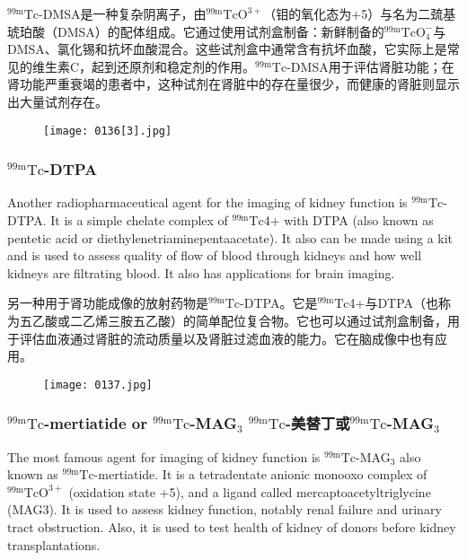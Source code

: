 \documentclass[dvipsnames, svgnames,a4paper,11pt]{article}
\begin{document}
${}^\mathrm{99m}\mathrm{Tc}$-DMSA是一种复杂阴离子，由${}^\mathrm{99m}\mathrm{TcO^{3+}}$（钼的氧化态为+5）与名为二巯基琥珀酸（DMSA）的配体组成。它通过使用试剂盒制备：新鲜制备的${}^\mathrm{99m}\mathrm{TcO_4^-}$与DMSA、氯化锡和抗坏血酸混合。这些试剂盒中通常含有抗坏血酸，它实际上是常见的维生素C，起到还原剂和稳定剂的作用。${}^\mathrm{99m}\mathrm{Tc}$-DMSA用于评估肾脏功能；在肾功能严重衰竭的患者中，这种试剂在肾脏中的存在量很少，而健康的肾脏则显示出大量试剂存在。

\begin{figure}[h]
	\centering
    \texttt{[image: 0136[3].jpg]}    
     \label{fig140}
\end{figure}

\subsubsection{${}^\mathrm{99m}\mathrm{Tc}$-DTPA}

Another radiopharmaceutical agent for the imaging of kidney function is ${}^\mathrm{99m}\mathrm{Tc}$-DTPA.
It is a simple chelate complex of ${}^\mathrm{99m}\mathrm{Tc}$4+ with DTPA (also known as pentetic acid or
diethylenetriaminepentaacetate). It also can be made using a kit and is used to
assess quality of flow of blood through kidneys and how well kidneys are filtrating
blood. It also has applications for brain imaging.

另一种用于肾功能成像的放射药物是${}^\mathrm{99m}\mathrm{Tc}$-DTPA。它是${}^\mathrm{99m}\mathrm{Tc}$4+与DTPA（也称为五乙酸或二乙烯三胺五乙酸）的简单配位复合物。它也可以通过试剂盒制备，用于评估血液通过肾脏的流动质量以及肾脏过滤血液的能力。它在脑成像中也有应用。

\begin{figure}[h]
	\centering
    \texttt{[image: 0137.jpg]}    
     \label{fig141}
\end{figure}

\subsubsection{${}^\mathrm{99m}\mathrm{Tc}$-mertiatide or ${}^\mathrm{99m}\mathrm{Tc}$-MAG${}_3$ ${}^\mathrm{99m}\mathrm{Tc}$-美替丁或${}^\mathrm{99m}\mathrm{Tc}$-MAG${}_3$}

The most famous agent for imaging of kidney function is ${}^\mathrm{99m}\mathrm{Tc}$-MAG${}_3$ also known as
${}^\mathrm{99m}\mathrm{Tc}$-mertiatide. It is a tetradentate anionic monooxo complex of ${}^\mathrm{99m}\mathrm{TcO^{3+}}$ (oxidation
state +5), and a ligand called mercaptoacetyltriglycine (MAG3). It is used to assess
kidney function, notably renal failure and urinary tract obstruction. Also, it is used to
test health of kidney of donors before kidney transplantations.
\end{document}
